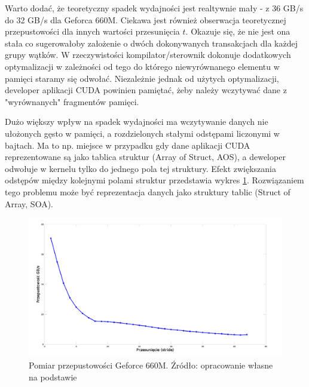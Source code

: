 Warto dodać, że teoretyczny spadek wydajności jest realtywnie
mały - z 36 GB/s do 32 GB/s dla Geforca 660M. Ciekawa jest również obserwacja
teoretycznej przepustowości dla innych wartości przesunięcia $t$. Okazuje się,
			 że nie jest ona stała co sugerowałoby założenie o dwóch dokonywanych
			 transakcjach dla każdej grupy wątków. W rzeczywistości
			 kompilator/sterownik dokonuje dodatkowych optymalizacji w
			 zależności od tego do którego niewyrównanego elementu w pamięci staramy się
			 odwołać. Niezależnie jednak od użytych optymalizacji, developer aplikacji CUDA
			 powinien pamiętać, żeby należy wczytywać dane z "wyrównanych"
			 fragmentów pamięci.

Dużo większy wpływ na spadek wydajności ma wczytywanie danych nie ułożonych gęsto w
pamięci, a rozdzielonych stałymi odstępami liczonymi w bajtach. Ma to np. miejsce w przypadku gdy
dane aplikacji CUDA reprezentowane są jako tablica struktur (Array of Struct, AOS), a deweloper
odwołuje w kernelu tylko do jednego pola tej struktury. Efekt zwiększania odstępów
między kolejnymi polami struktur przedstawia wykres \ref{hier}. Rozwiązaniem tego
problemu może być reprezentacja danych jako struktury tablic (Struct of Array,
		SOA).

\begin{figure}[H]
\centering
\includegraphics[scale=0.4]{images/gf660_stride.png}
\caption{Pomiar przepustowości Geforce 660M. Źródło: opracowanie własne na
	podstawie \cite{memperf}}
\label{hier}
\end{figure}
